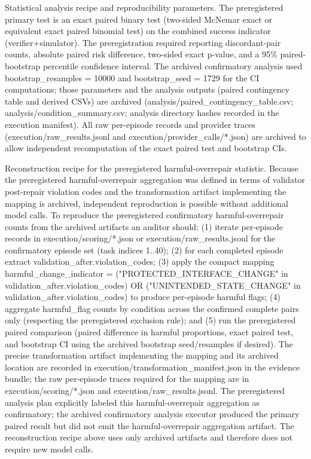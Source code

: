 \documentclass[conference]{IEEEtran}
\begin{document}
Statistical analysis recipe and reproducibility parameters. The preregistered primary test is an exact paired binary test (two-sided McNemar exact or equivalent exact paired binomial test) on the combined success indicator (verifier+simulator). The preregistration required reporting discordant-pair counts, absolute paired risk difference, two-sided exact p-value, and a 95\% paired-bootstrap percentile confidence interval. The archived confirmatory analysis used bootstrap\_resamples = 10000 and bootstrap\_seed = 1729 for the CI computations; those parameters and the analysis outputs (paired contingency table and derived CSVs) are archived (analysis/paired\_contingency\_table.csv; analysis/condition\_summary.csv; analysis directory hashes recorded in the execution manifest). All raw per-episode records and provider traces (execution/raw\_results.jsonl and execution/provider\_calls/*.json) are archived to allow independent recomputation of the exact paired test and bootstrap CIs.

Reconstruction recipe for the preregistered harmful-overrepair statistic. Because the preregistered harmful-overrepair aggregation was defined in terms of validator post-repair violation codes and the transformation artifact implementing the mapping is archived, independent reproduction is possible without additional model calls. To reproduce the preregistered confirmatory harmful-overrepair counts from the archived artifacts an auditor should: (1) iterate per-episode records in execution/scoring/*.json or execution/raw\_results.jsonl for the confirmatory episode set (task indices 1..40); (2) for each completed episode extract validation\_after.violation\_codes; (3) apply the compact mapping harmful\_change\_indicator = ("PROTECTED\_INTERFACE\_CHANGE" in validation\_after.violation\_codes) OR ("UNINTENDED\_STATE\_CHANGE" in validation\_after.violation\_codes) to produce per-episode harmful flags; (4) aggregate harmful\_flag counts by condition across the confirmed complete pairs only (respecting the preregistered exclusion rule); and (5) run the preregistered paired comparison (paired difference in harmful proportions, exact paired test, and bootstrap CI using the archived bootstrap seed/resamples if desired). The precise transformation artifact implementing the mapping and its archived location are recorded in execution/transformation\_manifest.json in the evidence bundle; the raw per-episode traces required for the mapping are in execution/scoring/*.json and execution/raw\_results.jsonl. The preregistered analysis plan explicitly labeled this harmful-overrepair aggregation as confirmatory; the archived confirmatory analysis executor produced the primary paired result but did not emit the harmful-overrepair aggregation artifact. The reconstruction recipe above uses only archived artifacts and therefore does not require new model calls.
\end{document}
